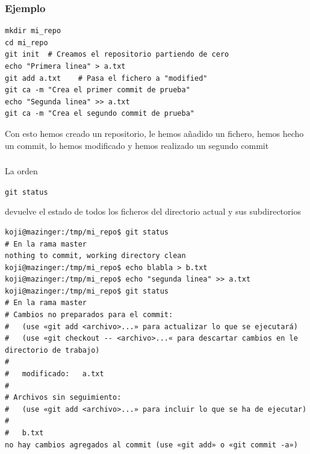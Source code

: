\documentclass[ucs]{beamer}
\begin{document}
\begin{frame}[fragile]
\frametitle{Ejemplo }

  \begin{footnotesize}
  \begin{verbatim}
mkdir mi_repo
cd mi_repo
git init  # Creamos el repositorio partiendo de cero
echo "Primera linea" > a.txt
git add a.txt    # Pasa el fichero a "modified"
git ca -m "Crea el primer commit de prueba"
echo "Segunda linea" >> a.txt
git ca -m "Crea el segundo commit de prueba"
  \end{verbatim}
  \end{footnotesize}




Con esto hemos creado un repositorio, le hemos añadido un fichero, hemos hecho un commit, lo 
hemos modificado y hemos realizado un segundo commit
\end{frame}


\begin{frame}[fragile]
\frametitle{}
La orden 

\verb|git status|

devuelve el estado de todos los ficheros del directorio actual
y sus subdirectorios

  \begin{scriptsize}
  \begin{verbatim}
koji@mazinger:/tmp/mi_repo$ git status
# En la rama master
nothing to commit, working directory clean
koji@mazinger:/tmp/mi_repo$ echo blabla > b.txt
koji@mazinger:/tmp/mi_repo$ echo "segunda linea" >> a.txt 
koji@mazinger:/tmp/mi_repo$ git status
# En la rama master
# Cambios no preparados para el commit:
#   (use «git add <archivo>...» para actualizar lo que se ejecutará)
#   (use «git checkout -- <archivo>...« para descartar cambios en le directorio de trabajo)
#
#	modificado:   a.txt
#
# Archivos sin seguimiento:
#   (use «git add <archivo>...» para incluir lo que se ha de ejecutar)
#
#	b.txt
no hay cambios agregados al commit (use «git add» o «git commit -a»)

  \end{verbatim}
  \end{scriptsize}

\end{frame}
\end{document}
